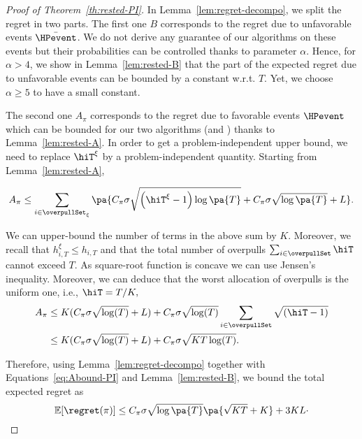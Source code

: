 \begin{proof}[Proof of Theorem~\ref{th:rested-PI}]
In Lemma~\ref{lem:regret-decompo}, we split the regret in two parts. The first one $B$ corresponds to the regret due to unfavorable events $\bar{\HPevent}$. We do not derive any guarantee of our algorithms on these events but their probabilities can be controlled thanks to parameter $\alpha$. Hence, for $\alpha > 4$, we show in Lemma~\ref{lem:rested-B} that the part of the expected regret due to unfavorable events can be bounded by a constant w.r.t. $T$. Yet, we choose $\alpha \geq 5$ to have a small constant.

The second one $A_\pi$ corresponds to the regret due to favorable events $\HPevent$ which can be bounded for our two algorithms (\FEWA and \RUCB) thanks to Lemma~\ref{lem:rested-A}. In order to get a problem-independent upper bound, we need to replace $\hiT^\xi$ by a problem-independent quantity. Starting from Lemma~\ref{lem:rested-A},

\begin{equation*}
A_{\pi} \leq \sum_{i\in \overpullSet_\xi} \pa{C_\pi \sigma \sqrt{\left(\hiT^\xi -1\right)\log\pa{T}} +C_\pi \sigma\sqrt{\log{\pa{T}}}+  L}.
\end{equation*}

We can upper-bound the number of terms in the above sum by  $K$. Moreover, we recall that $h_{i,T}^\xi \leq h_{i,T}$ and that  the total number of overpulls $\sum_{i\in\overpullSet} \hiT$ cannot exceed $T$. 
As square-root function is concave we can use Jensen's inequality. 
Moreover, we can deduce that the worst allocation of overpulls is the uniform one, i.e., $\hiT = T/K,$
\begin{align}
A_{\pi} &\leq K(C_\pi \sigma\sqrt{\log(T)} + L) + C_\pi \sigma\sqrt{\log(T)} \sum_{i\in \overpullSet} \sqrt{(\hiT - 1)}\nonumber\\ 
&\leq K (C_\pi \sigma\sqrt{\log(T)} + L) + C_\pi \sigma\sqrt{KT\log(T)}.
\label{eq:Abound-PI}
\end{align}

Therefore, using Lemma~\ref{lem:regret-decompo} together with Equations~\ref{eq:Abound-PI} and Lemma~\ref{lem:rested-B}, we bound the total expected regret as
\begin{equation}
\mathbb{E}[\regret(\pi)] \leq C_\pi \sigma\sqrt{\log\pa{T}}\pa{\sqrt{KT} +K} + 3KL\cdot
\end{equation}
\end{proof}

